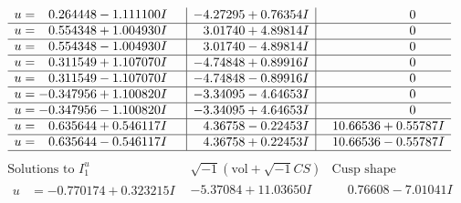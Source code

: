 \documentclass[1p]{elsarticle_modified}
\theoremstyle{definition}
\newcommand{\I}{\sqrt{-1}}
\begin{document}
$$\begin{array}{c|c|c}
\begin{aligned}
u &= \phantom{-}0.264448 - 1.111100 I\end{aligned}
 & -4.27295 + 0.76354 I & \phantom{-0.000000 } 0 \\ \hline\begin{aligned}
u &= \phantom{-}0.554348 + 1.004930 I\end{aligned}
 & \phantom{-}3.01740 + 4.89814 I & \phantom{-0.000000 } 0 \\ \hline\begin{aligned}
u &= \phantom{-}0.554348 - 1.004930 I\end{aligned}
 & \phantom{-}3.01740 - 4.89814 I & \phantom{-0.000000 } 0 \\ \hline\begin{aligned}
u &= \phantom{-}0.311549 + 1.107070 I\end{aligned}
 & -4.74848 + 0.89916 I & \phantom{-0.000000 } 0 \\ \hline\begin{aligned}
u &= \phantom{-}0.311549 - 1.107070 I\end{aligned}
 & -4.74848 - 0.89916 I & \phantom{-0.000000 } 0 \\ \hline\begin{aligned}
u &= -0.347956 + 1.100820 I\end{aligned}
 & -3.34095 - 4.64653 I & \phantom{-0.000000 } 0 \\ \hline\begin{aligned}
u &= -0.347956 - 1.100820 I\end{aligned}
 & -3.34095 + 4.64653 I & \phantom{-0.000000 } 0 \\ \hline\begin{aligned}
u &= \phantom{-}0.635644 + 0.546117 I\end{aligned}
 & \phantom{-}4.36758 - 0.22453 I & \phantom{-}10.66536 + 0.55787 I \\ \hline\begin{aligned}
u &= \phantom{-}0.635644 - 0.546117 I\end{aligned}
 & \phantom{-}4.36758 + 0.22453 I & \phantom{-}10.66536 - 0.55787 I\\
 \hline 
 \end{array}$$\newpage$$\begin{array}{c|c|c}  
\text{Solutions to }I^u_{1}& \I (\text{vol} + \sqrt{-1}CS) & \text{Cusp shape}\\
 \hline 
\begin{aligned}
u &= -0.770174 + 0.323215 I\end{aligned}
 & -5.37084 + 11.03650 I & \phantom{-}0.76608 - 7.01041 I \\ \hline\begin{aligned}

\end{aligned}
\end{array}$$
\end{document}
